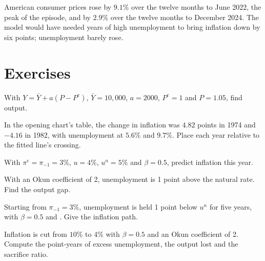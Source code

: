 \begin{record}[2021--23]
American consumer prices rose by $9.1\%$ over the twelve months to June 2022,
the peak of the episode, and by $2.9\%$ over the twelve months to December
2024. %
The  model would have needed years of high unemployment to bring
inflation down by six points; unemployment barely rose.
\end{record}

\section*{Exercises}\label{sec:b1:aggregate-supply:exercises}

\begin{exercise}[$\star$]\label{exo:b1:aggregate-supply:sras-ex}
With $Y = \bar Y + a(P - P^e)$, $\bar Y = 10{,}000$, $a = 2000$, $P^e = 1$ and $P = 1.05$, find output.
\end{exercise}

\begin{exercise}[$\star$]\label{exo:b1:aggregate-supply:read}
In the opening chart's table, the change in inflation was $4.82$ points in
1974 and $-4.16$ in 1982, with unemployment at $5.6\%$ and $9.7\%$.
Place each year relative to the fitted line's crossing.
\end{exercise}

\begin{exercise}[$\star$]\label{exo:b1:aggregate-supply:predict}
With $\pi^e = \pi_{-1} = 3\%$, $u = 4\%$, $u^n = 5\%$ and $\beta = 0.5$, predict inflation this year.
\end{exercise}

\begin{exercise}[$\star$]\label{exo:b1:aggregate-supply:okun-ex}
With an Okun coefficient of 2, unemployment is 1 point above the natural
rate. Find the output gap.
\end{exercise}

\begin{exercise}[$\star\star$]\label{exo:b1:aggregate-supply:five}
Starting from $\pi_{-1} = 3\%$, unemployment is held 1 point below $u^n$ for five years, with
$\beta = 0.5$ and . Give the inflation path.
\end{exercise}

\begin{exercise}[$\star\star$]\label{exo:b1:aggregate-supply:sacrifice}
Inflation is cut from $10\%$ to $4\%$ with $\beta = 0.5$ and an Okun coefficient of 2.
Compute the point-years of excess unemployment, the output lost and the
sacrifice ratio.
\end{exercise}

